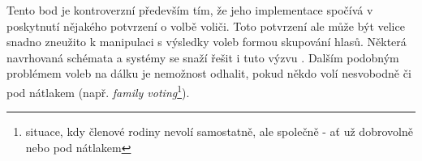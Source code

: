 Tento bod je kontroverzní především tím, že jeho implementace spočívá v poskytnutí nějakého potvrzení o volbě voliči. Toto potvrzení ale může být velice snadno zneužito k manipulaci s výsledky voleb formou skupování hlasů. Některá navrhovaná schémata a systémy se snaží řešit i tuto výzvu \cite{receiptFree}. Dalším podobným problémem voleb na dálku je nemožnost odhalit, pokud někdo volí nesvobodně či pod nátlakem (např. \textit{family voting}\footnote{situace, kdy členové rodiny nevolí samostatně, ale společně - ať už dobrovolně nebo pod nátlakem}).